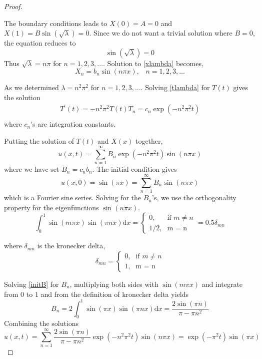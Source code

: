 \documentclass[12pt, oneside]{book}
\theoremstyle{plain}
\theoremstyle{definition}
\begin{document}
\begin{proof}
\begin{itemize}
The boundary conditions leads to $ X(0) = A = 0$ and $ X(1) = B \sin(\sqrt{\lambda}) = 0$. Since we do not want a trivial solution where $B = 0$, the equation reduces to 
\begin{equation}
\sin(\sqrt{\lambda}) = 0
\end{equation} 
Thus $ \sqrt{\lambda} = n \pi $ for $n = 1,2,3, ...$. 
Solution to \ref{xlambda} becomes,
\begin{equation}
X_n = b_n \sin(n \pi x), \hspace{10pt} n=1,2,3, ...
\end{equation}
\end{itemize}

As we determined $ \lambda = n^2 \pi^2 $ for $n = 1,2,3, ...$.  Solving \ref{tlambda} for $T(t)$ gives the solution
\begin{eqnarray}
T^{'}(t) = -n^2 \pi^2 T(t)
T_n = c_n \exp(-n^2 \pi ^2 t) \\[10pt]
\end{eqnarray}
where $c_n$'s are integration constants.

Putting the solution of $T(t)$ and $X(x)$ together,
\begin{equation}
u(x,t) = \sum_{n=1}^{\infty} B_n \exp(-n^2 \pi ^2 t) \sin(n \pi x)
\end{equation}
where we have set $B_n = c_n b_n$. The initial condition gives
\begin{equation} \label{initB}
u(x,0) = \sin(\pi x) = \sum_{n=1}^{\infty} B_n \sin(n \pi x)
\end{equation}
which is a Fourier sine series.  Solving for the $B_n$’s, we use the orthogonality property for the eigenfunctions $\sin(n \pi x)$.
    \[ \int_{0}^{1} \sin(m \pi x) \sin(\pi n x) \mathrm{d}x = \begin{cases} \mbox{0,} & \mbox{if } m \neq n \\ \mbox{1/2,} & \mbox{m = n} \end{cases} = 0.5 \delta _{mn} \]
    
where $ \delta _{mn}$ is the kronecker delta,  
\[  \delta _{mn} = \begin{cases} \mbox{0,} & \mbox{if } m \neq n \\ \mbox{1,} & \mbox{m = n} \end{cases} \]

Solving \ref{initB} for $B_n$, multiplying both sides with $\sin(m \pi x)$ and integrate from $0$ to $1$ and from the definition of kronecker delta yields
\begin{equation}
B_n = 2 \int_{0}^{1} \sin(\pi x) \sin(\pi n x) \mathrm{d}x = \frac{2 \sin(\pi n)}{\pi - \pi n^2}
\end{equation}
Combining the solutions
\begin{equation}
u(x,t) = \sum_{n=1}^{\infty} \frac{2 \sin(\pi n)}{\pi - \pi n^2} \exp(-n^2 \pi ^2 t) \sin(n \pi x)= \exp(-\pi^2 t) \sin(\pi x) 
\end{equation}
\end{proof}
\end{document}
